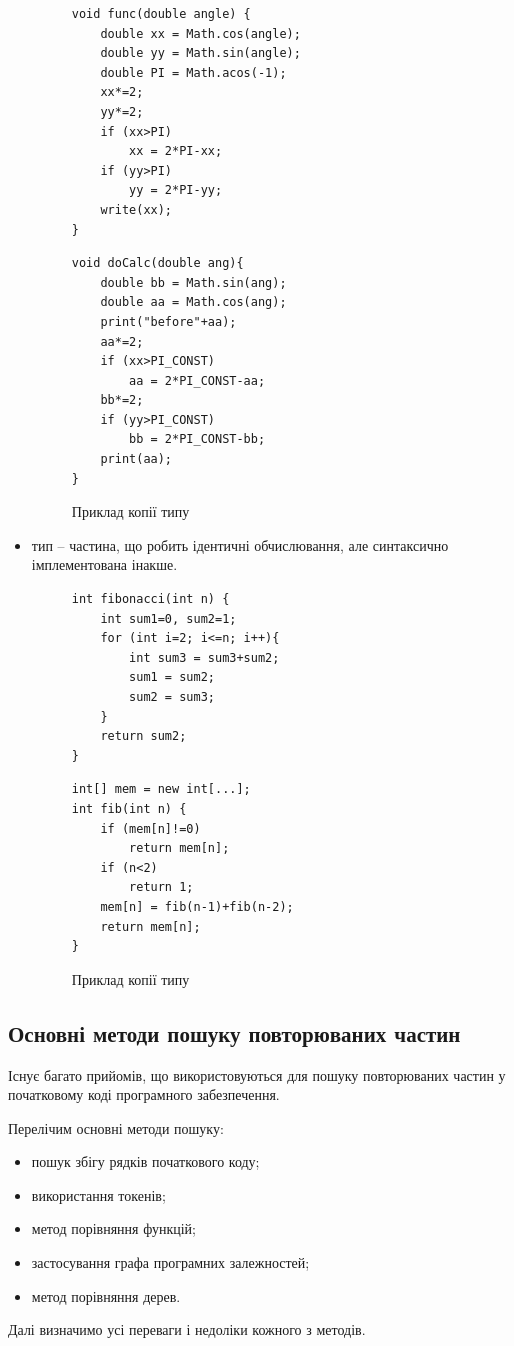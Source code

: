 \documentclass[a4paper, 14pt]{article}
\newcommand{\RNum}[1]{\uppercase\expandafter{\romannumeral #1\relax}}
\begin{document}
\begin{itemize}
\begin{figure}
\centering
\begin{minipage}[t]{.45\textwidth}
\begin{lstlisting}[frame=none]
void func(double angle) {
	double xx = Math.cos(angle);
	double yy = Math.sin(angle);
	double PI = Math.acos(-1);
	xx*=2;
	yy*=2;	
	if (xx>PI)
		xx = 2*PI-xx;
	if (yy>PI)
		yy = 2*PI-yy;
	write(xx);
}
\end{lstlisting}
\end{minipage}
\begin{minipage}[t]{.45\textwidth}
\begin{lstlisting}[frame=none]
void doCalc(double ang){
	double bb = Math.sin(ang);
	double aa = Math.cos(ang);
	print("before"+aa);
	aa*=2;
	if (xx>PI_CONST)
		aa = 2*PI_CONST-aa;
	bb*=2;	
	if (yy>PI_CONST)
		bb = 2*PI_CONST-bb;
	print(aa);
}
\end{lstlisting}
\end{minipage}
\caption*{Приклад копії \RNum{3} типу}
\end{figure}
\item \RNum{4} тип -- частина, що робить ідентичні обчислювання, але синтаксично імплементована інакше.
\begin{figure}
\centering
\begin{minipage}[t]{.45\textwidth}
\begin{lstlisting}[frame=none]
int fibonacci(int n) {
	int sum1=0, sum2=1;
	for (int i=2; i<=n; i++){
		int sum3 = sum3+sum2;
		sum1 = sum2;
		sum2 = sum3;
	}
	return sum2;
}
\end{lstlisting}
\end{minipage}
\begin{minipage}[t]{.45\textwidth}
\begin{lstlisting}[frame=none]
int[] mem = new int[...];
int fib(int n) {
	if (mem[n]!=0)
		return mem[n];
	if (n<2)
		return 1;
	mem[n] = fib(n-1)+fib(n-2);
	return mem[n];
}
\end{lstlisting}
\end{minipage}
\caption*{Приклад копії \RNum{4} типу}
\end{figure}
\end{itemize}
\subsection{Основні методи пошуку повторюваних частин}
Існує багато прийомів, що використовуються для пошуку повторюваних частин у початковому коді програмного забезпечення.

Перелічим основні методи пошуку:
\begin{itemize}
	\item пошук збігу рядків початкового коду; 
	\item використання токенів;
	\item метод порівняння функцій;
	\item застосування графа програмних залежностей;
	\item метод порівняння дерев.
\end{itemize}
Далі визначимо усі переваги і недоліки кожного з методів.
\end{document}
